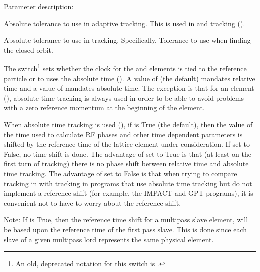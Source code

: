 {Parameter description:
\begin{description}
\item[\vn{abs_tol_adaptive_tracking}] \Newline
Absolute tolerance to use in adaptive tracking. This is used in  and
 tracking ().
%
\item[\vn{abs_tol_tracking}] \Newline
Absolute tolerance to use in tracking. Specifically, Tolerance to use when finding the closed orbit.
%
\item[\vn{absolute_time_tracking}] \Newline
The  switch\footnote
  {
An old, deprecated notation for this switch is .
  }
sets whether the clock for the  and  elements is tied to the reference
particle or to uses the absolute time (). A value of  (the default)
mandates relative time and a value of  mandates absolute time. The exception is that for an
 element (), absolute time tracking is always used in order to be able to
avoid problems with a zero reference momentum at the beginning of the element.
%
\item[\vn{absolute_time_ref_shift}] \Newline
When absolute time tracking is used (), if  is True (the
default), then the value of the time used to calculate RF phases and other time dependent parameters
is shifted by the reference time of the lattice element under consideration. If set to False, no
time shift is done. The advantage of  set to True is that (at least on
the first turn of tracking) there is no phase shift between relative time and absolute time
tracking. The advantage of  set to False is that when trying to compare
tracking in \bmad with tracking in programs that use absolute time tracking but do not implement a
reference shift (for example, the IMPACT and GPT programs), it is convenient not to have to worry
about the reference shift.

Note: If  is True, then the reference time shift for a multipass slave
element, will be based upon the reference time of the first pass slave. This is done since each
slave of a given multipass lord represents the same physical element.


\end{description}}
